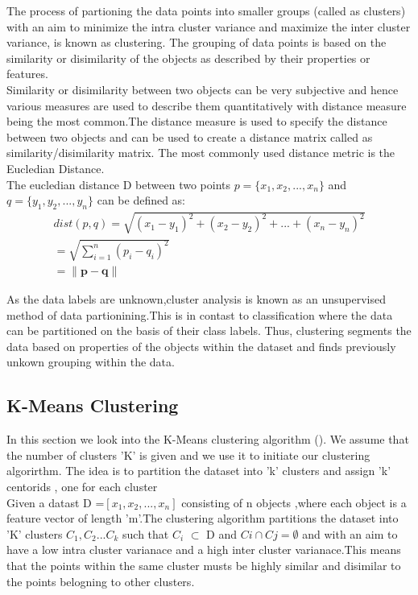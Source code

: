 The process of partioning the data points into smaller groups (called as clusters) with an aim to minimize the intra cluster variance and maximize the inter cluster variance, is known as clustering. The grouping of data points is based on the similarity or disimilarity of the objects as described by their properties or features.\\

Similarity or disimilarity between two objects can be very subjective and hence various measures are used to describe them quantitatively with distance measure being the most common.The distance measure is used to specify the distance between two objects and can be used to create a distance matrix called as similarity/disimilarity matrix. The most commonly used distance metric is the Eucledian Distance.\\

The eucledian distance D between two points $p =\{x_1, x_2, ... , x_n\}$ and $q =\{y_1, y_2, ... , y_n\}$ can be defined as:
\begin{equation}\label{eq: eucledian dist}
\begin{split}
dist(p,q) =  \sqrt{(x_1 - y_1)^2 + (x_2 - y_2)^2 + ... +(x_n - y_n)^2 } \\
		 =  \sqrt{\sum_{i=1}^{n}(p_i - q_i)^2} \\
		 = \lVert \mathbf{p-q} \rVert
\end{split}
\end{equation}

As the data labels are unknown,cluster analysis is known as an unsupervised method of data partionining.This is in contast to classification where the data can be partitioned on the basis of their class labels. Thus, clustering segments the data based on properties of the objects within the dataset and finds previously unkown grouping within the data.

\subsection{K-Means Clustering}\label{sec:kmeans}
In this section we look into the K-Means clustering algorithm (\citet{macqueen1967some}). We assume that the number of clusters 'K' is given and we use it to initiate our clustering algorirthm. The idea is to partition the dataset into 'k' clusters and assign 'k' centorids , one for each cluster \\

Given a datast D =$[x_1,x_2,...,x_n]$ consisting of n objects ,where each object is a feature vector of length 'm'.The clustering algorithm partitions the dataset into 'K' clusters $C_1,C_2...C_k$ such that $C_i$ $\subset$ D and $Ci \cap Cj = \emptyset$ and with an aim to have a low intra cluster varianace and a high inter cluster varianace.This means that the points within the same cluster musts be highly similar and disimilar to the points belogning to other clusters.\\

